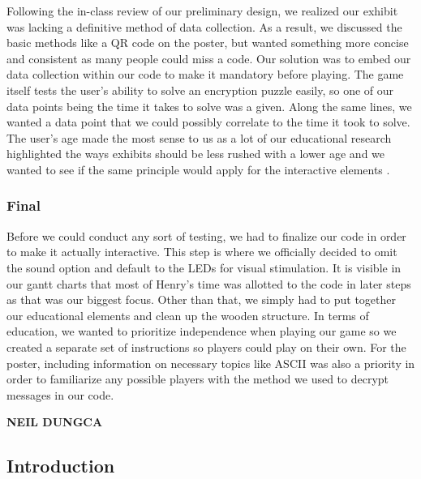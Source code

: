 \documentclass[conference]{IEEEtran}
\begin{document}
\par Following the in-class review of our preliminary design, we realized our exhibit was lacking a definitive method of data collection. As a result, we discussed the basic methods like a QR code on the poster, but wanted something more concise and consistent as many people could miss a code. Our solution was to embed our data collection within our code to make it mandatory before playing. The game itself tests the user’s ability to solve an encryption puzzle easily, so one of our data points being the time it takes to solve was a given. Along the same lines, we wanted a data point that we could possibly correlate to the time it took to solve. The user’s age made the most sense to us as a lot of our educational research highlighted the ways exhibits should be less rushed with a lower age and we wanted to see if the same principle would apply for the interactive elements \cite{b16}.

\subsubsection{Final}

\par Before we could conduct any sort of testing, we had to finalize our code in order to make it actually interactive. This step is where we officially decided to omit the sound option and default to the LEDs for visual stimulation. It is visible in our gantt charts that most of Henry’s time was allotted to the code in later steps as that was our biggest focus. Other than that, we simply had to put together our educational elements and clean up the wooden structure. In terms of education, we wanted to prioritize independence when playing our game so we created a separate set of instructions so players could play on their own. For the poster, including information on necessary topics like ASCII was also a priority in order to familiarize any possible players with the method we used to decrypt messages in our code. 

\newpage


\vspace{10pt} \LARGE \textbf{NEIL DUNGCA} \normalsize

\subsection{Introduction}
\end{document}
